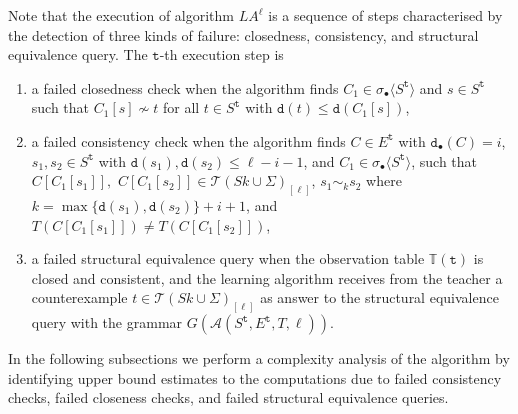 \documentclass[preprint,12pt,english]{article}
\def\hole{\bullet}
\def\cA{\mathcal{A}}
\def\cT{\mathcal{T}}
\def\depth{\mathtt{d}}
\newcommand\pair[1]{\langle{#1}\rangle}
\def\ty{\mathtt{t}}
\begin{document}
Note that the execution of algorithm $LA^\ell$ is a sequence of steps characterised by the detection of three kinds of failure:  closedness,  consistency, and structural equivalence query. The $\ty$-th execution step is
\begin{enumerate}
\item a failed closedness check when the algorithm finds $C_1\in\sigma_\hole\pair{S^{\ty}}$ and $s\in S^{\ty}$ such that $C_1[s]\nsim t$ for all $t\in S^{\ty}$ with $\depth(t)\leq\depth(C_1[s])$,
\item a failed consistency check when the algorithm finds $C\in E^{\ty}$ with $\depth_\hole(C)=i$, $s_1,s_2\in S^{\ty}$ with $\depth(s_1),\depth(s_2)\leq \ell-i-1$, and $C_1\in\sigma_\hole\pair{S^{\ty}}$, such that  $C[C_1[s_1]],$ $C[C_1[s_2]]\in\cT(Sk\cup\Sigma)_{[\ell]}$, $s_1\sim_k s_2$ where $k=\max\{\depth(s_1),\depth(s_2)\}+i+1$, and $T(C[C_1[s_1]])\neq T(C[C_1[s_2]])$,
\item a failed structural equivalence query when the observation table $\mathbb{T}(\ty)$ is closed and consistent, and the learning algorithm receives from the teacher a counterexample $t\in\cT(Sk\cup\Sigma)_{[\ell]}$ as answer to the structural equivalence query with the grammar $G(\cA(S^{\ty},E^{\ty},T,\ell)).$
\end{enumerate}
In the following subsections we perform a complexity analysis of the algorithm by identifying upper bound estimates to the computations due to failed  consistency checks, failed closeness checks, and failed structural equivalence queries. 
\end{document}
